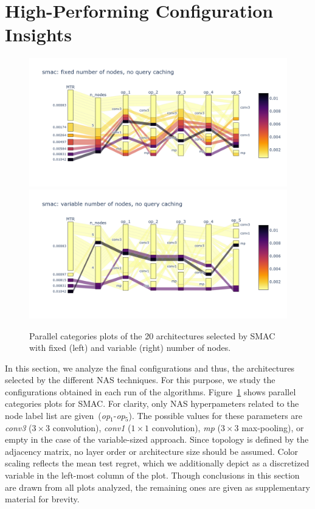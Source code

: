 \section{High-Performing Configuration Insights}
\label{sec:configurations}

\begin{figure}[!t]
\centering
\includegraphics[width=0.47\linewidth, clip=true, trim=142px 155px 210px 170px]{imgs/parcat/smac-fnn-nc.png}
\includegraphics[width=0.51\linewidth, clip=true, trim=142px 155px 40px 170px]{imgs/parcat/smac-vnn-nc.png}
\caption{Parallel categories plots of the 20 architectures selected by SMAC with fixed (left) and variable (right) number of nodes.}
\label{fig:pc-smac}
\end{figure}

In this section, we analyze the final configurations and thus, the architectures selected by the different NAS techniques. For this purpose, we study the configurations obtained in each run of the algorithms. Figure~\ref{fig:pc-smac} shows parallel categories plots for SMAC. For clarity, only NAS hyperpameters related to the node label list are given~(\textit{op$_1$}-\textit{op$_5$}).
The possible values for these parameters are \textit{conv3} ($3 \times 3$ convolution), \textit{conv1} ($1 \times 1$ convolution), \textit{mp} ($3 \times 3$ max-pooling), or empty in the case of the variable-sized approach. 
Since topology is defined by the adjacency matrix, no layer order or architecture size should be assumed.
Color scaling reflects the mean test regret, which we additionally depict as a discretized variable in the left-most column of the plot. Though conclusions in this section are drawn from all plots analyzed, the remaining ones 
are given as supplementary material for brevity.

